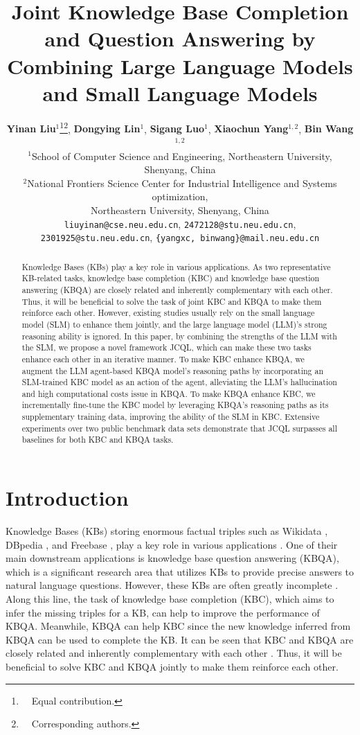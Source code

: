 \documentclass[11pt]{article}
\title{Joint Knowledge Base Completion and Question Answering by Combining Large Language Models and Small Language Models}
\author{
 \textbf{Yinan Liu$^1$}\thanks{\ \ Equal contribution.}\thanks{\ \ Corresponding authors.},
 \textbf{Dongying Lin$^1$}\footnotemark[1],
 \textbf{Sigang Luo$^1$},
 \textbf{Xiaochun Yang$^{1,2}$},
 \textbf{Bin Wang$^{1,2}$}
\\
$^1$School of Computer Science and Engineering, Northeastern University, Shenyang, China\\
$^2$National Frontiers Science Center for Industrial Intelligence and Systems optimization, \\Northeastern University, Shenyang, China\\
\small \texttt{liuyinan@cse.neu.edu.cn},
\small \texttt{2472128@stu.neu.edu.cn}, \\
\small \texttt{2301925@stu.neu.edu.cn},
\small \texttt{\{yangxc, binwang\}@mail.neu.edu.cn}
}
\begin{document}
\maketitle
\begin{abstract}
Knowledge Bases (KBs) play a key role in various applications. As two representative KB-related tasks, knowledge base completion (KBC) and knowledge base question answering (KBQA) are closely related and inherently complementary with each other. Thus, it will be beneficial to solve the task of joint KBC and KBQA to make them reinforce each other. However, existing studies usually rely on the small language model (SLM) to enhance them jointly, and the large language model (LLM)'s strong reasoning ability is ignored. In this paper, by combining the strengths of the LLM with the SLM, we propose a novel framework JCQL, which can make these two tasks enhance each other in an iterative manner. To make KBC enhance KBQA, we augment the LLM agent-based KBQA model's reasoning paths by incorporating an SLM-trained KBC model as an action of the agent, alleviating the LLM's hallucination and high computational costs issue in KBQA. To make KBQA enhance KBC, we incrementally fine-tune the KBC model by leveraging KBQA's reasoning paths as its supplementary training data, improving the ability of the SLM in KBC. Extensive experiments over two public benchmark data sets demonstrate that JCQL surpasses all baselines for both KBC and KBQA tasks.
\end{abstract}

\section{Introduction}
Knowledge Bases (KBs) storing enormous factual triples such as Wikidata \cite{vrandevcic2014wikidata}, DBpedia \cite{lehmann2015dbpedia}, and Freebase \cite{10.1145/1376616.1376746}, play a key role in various applications \cite{diaglink}. One of their main downstream applications is knowledge base question answering (KBQA), which is a significant research area that utilizes KBs to provide precise answers to natural language questions. However, these KBs are often greatly incomplete \cite{bordes2013}. Along this line, the task of knowledge base completion (KBC), which aims to infer the missing triples for a KB, can help to improve the performance of KBQA. Meanwhile, KBQA can help KBC since the new knowledge inferred from KBQA can be used to complete the KB. It can be seen that KBC and KBQA are closely related and inherently complementary with each other \cite{lihui2022binet}. Thus, it will be beneficial to solve KBC and KBQA jointly to make them reinforce each other.
\end{document}
